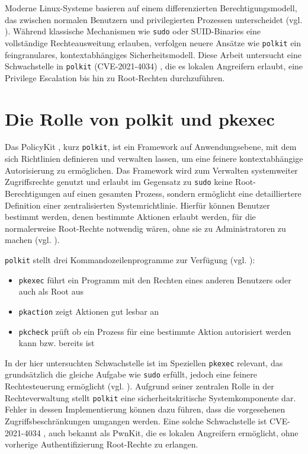 \documentclass[oneside,11pt,a4paper,article,german]{memoir}
\begin{document}
Moderne Linux-Systeme basieren auf einem differenzierten
Berechtigungsmodell, das zwischen normalen Benutzern und privilegierten Prozessen
unterscheidet (vgl. \cite{n3_users_permissions}). Während klassische Mechanismen wie \texttt{sudo} \cite{n4_ubuntuusers_sudo} oder SUID-Binaries \cite{n4_archlinux_security_suid_sgid}
eine vollständige Rechteausweitung erlauben, verfolgen neuere Ansätze wie
\texttt{polkit} \cite{n1_polkit} ein feingranulares, kontextabhängiges Sicherheitsmodell. Diese Arbeit untersucht eine Schwachstelle in \texttt{polkit}
(CVE-2021-4034) \cite{n3_cve_2021_4034}, die es lokalen Angreifern erlaubt, eine Privilege Escalation bis hin zu Root-Rechten durchzuführen.

\section{Die Rolle von polkit und pkexec}
Das PolicyKit \cite{n1_polkit}, kurz \texttt{polkit}, ist ein Framework auf
Anwendungsebene, mit dem sich Richtlinien definieren und verwalten lassen, um
eine feinere kontextabhängige Autorisierung zu ermöglichen. Das Framework wird zum
Verwalten systemweiter Zugriffsrechte genutzt und erlaubt im Gegensatz zu
\texttt{sudo} \cite{n4_ubuntuusers_sudo} keine Root-Berechtigungen auf einen gesamten Prozess, sondern
ermöglicht eine detailliertere Definition einer zentralisierten Systemrichtlinie. Hierfür können Benutzer bestimmt werden, denen
bestimmte Aktionen erlaubt werden, für die normalerweise Root-Rechte notwendig
wären, ohne sie zu Administratoren zu machen (vgl. \cite{n2_ubuntuusers.de_polkit}).

\texttt{polkit} stellt drei Kommandozeilenprogramme zur Verfügung (vgl. \cite{n2_ubuntuusers.de_polkit}):

\begin{itemize}
    \item \texttt{pkexec} führt ein Programm mit den Rechten eines anderen Benutzers oder auch als Root aus
    \item \texttt{pkaction} zeigt Aktionen gut lesbar an
    \item \texttt{pkcheck} prüft ob ein Prozess für eine bestimmte Aktion autorisiert werden kann bzw. bereits ist
\end{itemize}

In der hier untersuchten Schwachstelle ist im Speziellen \texttt{pkexec} relevant, das grundsätzlich die gleiche Aufgabe wie \texttt{sudo} erfüllt,
jedoch eine feinere Rechtesteuerung ermöglicht (vgl. \cite{n2_ubuntuusers.de_polkit}). Aufgrund seiner zentralen Rolle in der Rechteverwaltung
stellt \texttt{polkit} eine sicherheitskritische Systemkomponente dar. Fehler in dessen Implementierung können dazu führen, dass die vorgesehenen Zugriffsbeschränkungen
umgangen werden. Eine solche Schwachstelle ist CVE-2021-4034 \cite{n3_cve_2021_4034}, auch bekannt als PwnKit, die es lokalen Angreifern ermöglicht, ohne vorherige
Authentifizierung Root-Rechte zu erlangen.
\end{document}
